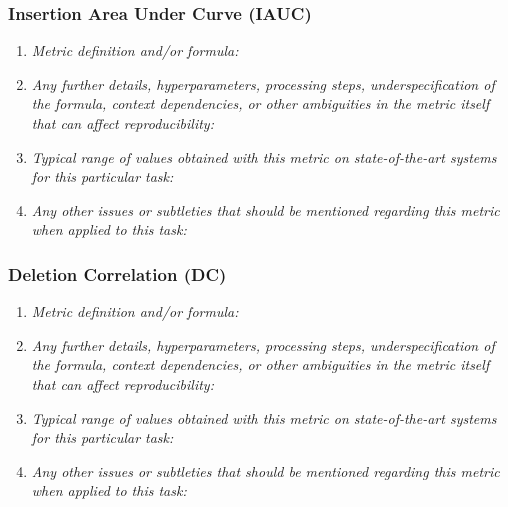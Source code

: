\documentclass[a4paper,11pt]{article}
\begin{document}
        \subsubsection{Insertion Area Under Curve (IAUC)}
            \begin{enumerate}[label=\alph*.]
                \item \textit{Metric definition and/or formula:}
                \bigskip
                \item \textit{Any further details, hyperparameters, processing steps, underspecification of the formula, context dependencies, or other ambiguities in the metric itself that can affect reproducibility:}
                \bigskip
                \item \textit{Typical range of values obtained with this metric on state-of-the-art systems for this particular task:}
                \bigskip
                \item \textit{Any other issues or subtleties that should be mentioned regarding this metric when applied to this task:}
                \bigskip
            \end{enumerate}
        \subsubsection{Deletion Correlation (DC)}
            \begin{enumerate}[label=\alph*.]
                \item \textit{Metric definition and/or formula:}
                \bigskip
                \item \textit{Any further details, hyperparameters, processing steps, underspecification of the formula, context dependencies, or other ambiguities in the metric itself that can affect reproducibility:}
                \bigskip
                \item \textit{Typical range of values obtained with this metric on state-of-the-art systems for this particular task:}
                \bigskip
                \item \textit{Any other issues or subtleties that should be mentioned regarding this metric when applied to this task:}
                \bigskip
            \end{enumerate}
\end{document}

